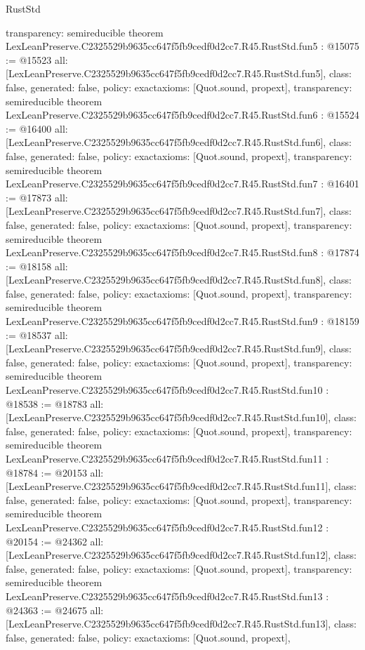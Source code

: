 \begin{lexlean}{RustStd}
\begin{coremodule}
{  transparency: semireducible
}
theorem LexLeanPreserve.C2325529b9635cc647f5fb9cedf0d2cc7.R45.RustStd.fun5 : @15075 := @15523 {
  all: [LexLeanPreserve.C2325529b9635cc647f5fb9cedf0d2cc7.R45.RustStd.fun5],
  class: false,
  generated: false,
  policy: exact{axioms: [Quot.sound, propext]},
  transparency: semireducible
}
theorem LexLeanPreserve.C2325529b9635cc647f5fb9cedf0d2cc7.R45.RustStd.fun6 : @15524 := @16400 {
  all: [LexLeanPreserve.C2325529b9635cc647f5fb9cedf0d2cc7.R45.RustStd.fun6],
  class: false,
  generated: false,
  policy: exact{axioms: [Quot.sound, propext]},
  transparency: semireducible
}
theorem LexLeanPreserve.C2325529b9635cc647f5fb9cedf0d2cc7.R45.RustStd.fun7 : @16401 := @17873 {
  all: [LexLeanPreserve.C2325529b9635cc647f5fb9cedf0d2cc7.R45.RustStd.fun7],
  class: false,
  generated: false,
  policy: exact{axioms: [Quot.sound, propext]},
  transparency: semireducible
}
theorem LexLeanPreserve.C2325529b9635cc647f5fb9cedf0d2cc7.R45.RustStd.fun8 : @17874 := @18158 {
  all: [LexLeanPreserve.C2325529b9635cc647f5fb9cedf0d2cc7.R45.RustStd.fun8],
  class: false,
  generated: false,
  policy: exact{axioms: [Quot.sound, propext]},
  transparency: semireducible
}
theorem LexLeanPreserve.C2325529b9635cc647f5fb9cedf0d2cc7.R45.RustStd.fun9 : @18159 := @18537 {
  all: [LexLeanPreserve.C2325529b9635cc647f5fb9cedf0d2cc7.R45.RustStd.fun9],
  class: false,
  generated: false,
  policy: exact{axioms: [Quot.sound, propext]},
  transparency: semireducible
}
theorem LexLeanPreserve.C2325529b9635cc647f5fb9cedf0d2cc7.R45.RustStd.fun10 : @18538 := @18783 {
  all: [LexLeanPreserve.C2325529b9635cc647f5fb9cedf0d2cc7.R45.RustStd.fun10],
  class: false,
  generated: false,
  policy: exact{axioms: [Quot.sound, propext]},
  transparency: semireducible
}
theorem LexLeanPreserve.C2325529b9635cc647f5fb9cedf0d2cc7.R45.RustStd.fun11 : @18784 := @20153 {
  all: [LexLeanPreserve.C2325529b9635cc647f5fb9cedf0d2cc7.R45.RustStd.fun11],
  class: false,
  generated: false,
  policy: exact{axioms: [Quot.sound, propext]},
  transparency: semireducible
}
theorem LexLeanPreserve.C2325529b9635cc647f5fb9cedf0d2cc7.R45.RustStd.fun12 : @20154 := @24362 {
  all: [LexLeanPreserve.C2325529b9635cc647f5fb9cedf0d2cc7.R45.RustStd.fun12],
  class: false,
  generated: false,
  policy: exact{axioms: [Quot.sound, propext]},
  transparency: semireducible
}
theorem LexLeanPreserve.C2325529b9635cc647f5fb9cedf0d2cc7.R45.RustStd.fun13 : @24363 := @24675 {
  all: [LexLeanPreserve.C2325529b9635cc647f5fb9cedf0d2cc7.R45.RustStd.fun13],
  class: false,
  generated: false,
  policy: exact{axioms: [Quot.sound, propext]},
}
\end{coremodule}
\end{lexlean}
